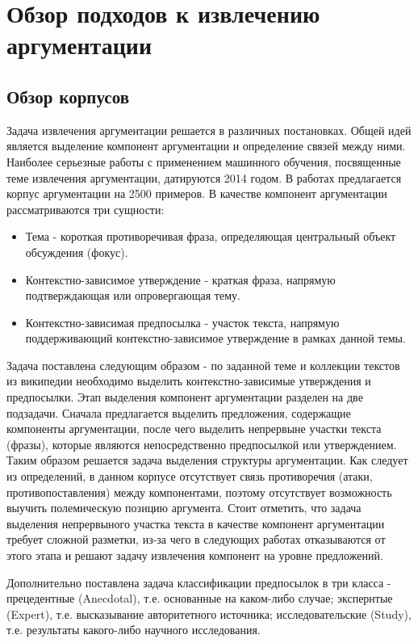 \section{Обзор подходов к извлечению аргументации}

\subsection{Обзор корпусов}
Задача извлечения аргументации решается в различных постановках. Общей идей является выделение компонент аргументации и определение связей между ними. Наиболее серьезные работы с применением машинного обучения, посвященные теме извлечения аргументации, датируются 2014 годом. В работах \cite{aharoni2014benchmark, rinott2015show} предлагается корпус аргументации на 2500 примеров. В качестве компонент аргументации рассматриваются три сущности:
\begin{itemize}
    \item Тема - короткая противоречивая фраза, определяющая центральный объект обсуждения (фокус).
    \item Контекстно-зависимое утверждение - краткая фраза, напрямую подтверждающая или опровергающая тему.
    \item Контекстно-зависимая предпосылка - участок текста, напрямую поддерживающий контекстно-зависимое утверждение в рамках данной темы.
\end{itemize}

Задача поставлена следующим образом - по заданной теме и коллекции текстов из википедии необходимо выделить контекстно-зависимые утверждения и предпосылки. Этап выделения компонент аргументации разделен на две подзадачи. Сначала предлагается выделить предложения, содержащие компоненты аргументации, после чего выделить непрервыне участки текста (фразы), которые являются непосредственно предпосылкой или утверждением. Таким образом решается задача выделения структуры аргументации. Как следует из определений, в данном корпусе отсутствует связь противоречия (атаки, противопоставления) между компонентами, поэтому отсутствует возможность выучить полемическую позицию аргумента. Стоит отметить, что задача выделения непрервыного участка текста в качестве компонент аргументации требует сложной разметки, из-за чего в следующих работах отказываются от этого этапа и решают задачу извлечения компонент на уровне предложений.

Дополнительно поставлена задача классификации предпосылок в три класса - прецедентные (Anecdotal), т.е. основанные на каком-либо случае; экспернтые (Expert), т.е. высказывание авторитетного источника; исследовательские (Study), т.е. результаты какого-либо научного исследования.



